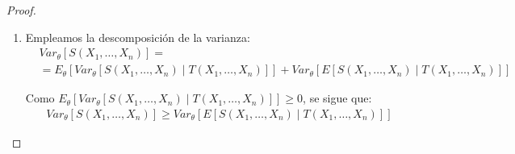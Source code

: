 \begin{teo}
\begin{proof}
\begin{enumerate}
            Veamos ahora que tiene momento de segundo orden finito. Como $S$ tiene momento de segundo orden finito, entonces su momento de segundo orden condicionado también es finito, luego:
            \begin{multline*}
                Var_\theta[S(X_1, \ldots, X_n) \mid T(X_1, \ldots, X_n)] =\\= E_\theta[S^2(X_1, \ldots, X_n) \mid T(X_1, \ldots, X_n)] - E_\theta[S(X_1, \ldots, X_n) \mid T(X_1, \ldots, X_n)]^2 \geq 0
            \end{multline*}

            Por tanto:
            \begin{multline*}
                E_\theta[S^2(X_1, \ldots, X_n) \mid T(X_1, \ldots, X_n)] \geq E_\theta[S(X_1, \ldots, X_n) \mid T(X_1, \ldots, X_n)]^2
            \end{multline*}

            Tomando esperanza:
            \begin{multline*}
                E_\theta[E_\theta[S(X_1, \ldots, X_n) \mid T(X_1, \ldots, X_n)]^2] \leq\\\leq E_\theta [E_\theta[S^2(X_1, \ldots, X_n) \mid T(X_1, \ldots, X_n)]]
                = E_\theta[S^2(X_1, \ldots, X_n)] < \infty
            \end{multline*}

            \item Empleamos la descomposición de la varianza:
            \begin{align*}
                &Var_\theta[S(X_1, \ldots, X_n)]
                =\\&= E_\theta[Var_\theta[S(X_1, \ldots, X_n) \mid T(X_1, \ldots, X_n)]] + Var_\theta[E[S(X_1, \ldots, X_n) \mid T(X_1, \ldots, X_n)]]
            \end{align*}

            Como $E_\theta[Var_\theta[S(X_1, \ldots, X_n) \mid T(X_1, \ldots, X_n)]] \geq 0$, se sigue que:
            \begin{align*}
                Var_\theta[S(X_1, \ldots, X_n)] \geq Var_\theta[E[S(X_1, \ldots, X_n) \mid T(X_1, \ldots, X_n)]]
            \end{align*}


        \end{enumerate}
    \end{proof}
\end{teo}

